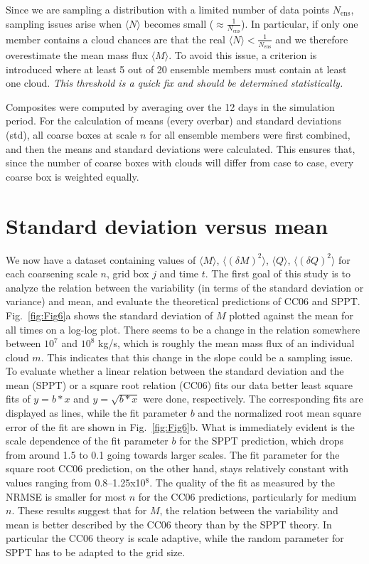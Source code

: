 \documentclass[a4paper, 12pt]{article}
\begin{document}
Since we are sampling a distribution with a limited number of data points $N_{\mathrm{ens}}$, sampling issues arise when $\langle N \rangle$ becomes small ($\approx \frac{1}{N_{\mathrm{ens}}}$). In particular, if only one member contains a cloud chances are that the real $\langle N \rangle < \frac{1}{N_{\mathrm{ens}}}$ and we therefore overestimate the mean mass flux $\langle M \rangle$. To avoid this issue, a criterion is introduced where at least 5 out of 20 ensemble members must contain at least one cloud. \textit{This threshold is a quick fix and should be determined statistically.}

Composites were computed by averaging over the 12 days in the simulation period. For the calculation of means (every overbar) and standard deviations (std), all coarse boxes at scale $n$ for all ensemble members were first combined, and then the means and standard deviations were calculated. This ensures that, since the number of coarse boxes with clouds will differ from case to case, every coarse box is weighted equally.

\section{Standard deviation versus mean}
We now have a dataset containing values of $\langle M \rangle$, $\langle (\delta M )^2 \rangle$, $\langle Q \rangle$, $\langle (\delta Q )^2 \rangle$ for each coarsening scale $n$, grid box $j$ and time $t$. The first goal of this study is to analyze the relation between the variability (in terms of the standard deviation or variance) and mean, and evaluate the theoretical predictions of CC06 and SPPT. Fig.~\ref{fig:Fig6}a shows the standard deviation of $M$ plotted against the mean for all times on a log-log plot. There seems to be a change in the relation somewhere between $10^7$ and $10^8$ kg/s, which is roughly the mean mass flux of an individual cloud $m$. This indicates that this change in the slope could be a sampling issue. To evaluate whether a linear relation between the standard deviation and the mean (SPPT) or a square root relation (CC06) fits our data better least square fits of $y = b*x$ and $y = \sqrt{b*x}$ were done, respectively. The corresponding fits are displayed as lines, while the fit parameter $b$ and the normalized root mean square error of the fit are shown in Fig.~\ref{fig:Fig6}b. What is immediately evident is the scale dependence of the fit parameter $b$ for the SPPT prediction, which drops from around 1.5 to 0.1 going towards larger scales. The fit parameter for the square root CC06 prediction, on the other hand, stays relatively constant with values ranging from 0.8--1.25x10$^8$. The quality of the fit as measured by the NRMSE is smaller for most $n$ for the CC06 predictions, particularly for medium $n$. These results suggest that for $M$, the relation between the variability and mean is better described by the CC06 theory than by the SPPT theory. In particular the CC06 theory is scale adaptive, while the random parameter for SPPT has to be adapted to the grid size.
\end{document}
